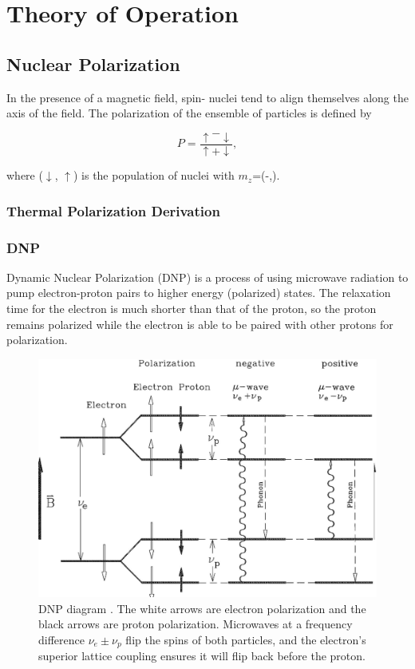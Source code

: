 \chapter{Theory of Operation} 
\label{theory}  
\section{Nuclear Polarization}
In the presence of a magnetic field, spin-\half{} nuclei tend to align themselves along the axis of the field.  The polarization of the ensemble of particles is defined by 

$$P=\frac{\uparrow-\downarrow}{\uparrow+\downarrow},$$

where ($\downarrow$, $\uparrow$) is the population of nuclei with $m_z$=(-\half,\half).

\subsection{Thermal Polarization Derivation}

 \subsection{DNP}
Dynamic Nuclear Polarization (DNP) is a process of using microwave radiation to pump electron-proton pairs to higher energy (polarized) states.  The relaxation time for the electron is much shorter than that of the proton, so the proton remains polarized while the electron is able to be paired with other protons for polarization.

\begin{figure}
 \centering
 \includegraphics[scale=.25]{img/dnp.png}
 \caption{DNP diagram \cite{dnpdiagram}.  The white arrows are electron polarization and the black arrows are proton polarization.  Microwaves at a frequency difference $\nu_e\pm\nu_p$ flip the spins of both particles, and the electron's superior lattice coupling ensures it will flip back before the proton.}
 \label{fig:dnp-diagram}
\end{figure}


